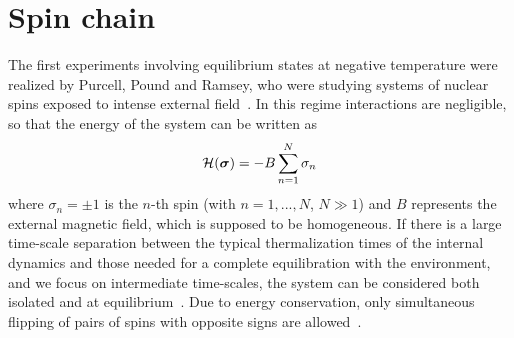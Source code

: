 \documentclass[iop, twocolumns, amssymb,notitlepage]{revtex4-1}
\DeclareRobustCommand{\vect}[1]{
  \ifcat#1\relax
    \boldsymbol{#1}
  \else
    \mathbf{#1}
  \fi}
\newcommand{\indice}{n}
\newcommand{\hh}{B}
\begin{document}
\section{Spin chain}
\label{sec:spin}
The first experiments involving equilibrium states at negative 
temperature were realized by Purcell, Pound and Ramsey, who were studying systems of nuclear 
spins exposed to intense external field~\cite{purcell51, ramsey56}. In this regime 
interactions are negligible, so that the energy of the system can be written as 
\begin{equation}
\label{eq:spinenergy}
 \mathcal{H}(\vect{\sigma})=-\hh\sum_{\indice=1}^{N}\sigma_\indice
\end{equation}
where $\sigma_\indice=\pm1$ is the $\indice$-th spin (with $\indice=1,...,N$, $N\gg1$) and $\hh$ 
represents the external magnetic field, which is supposed to be homogeneous. If 
there is a large time-scale separation between the typical thermalization times 
of the internal dynamics and those needed for a complete equilibration with the 
environment, and we focus on intermediate time-scales, the system can be 
considered both isolated and at equilibrium~\cite{purcell51, pound51}. Due to energy conservation, 
only simultaneous flipping of pairs of spins with opposite signs are allowed~\cite{abragam58}.
\end{document}
